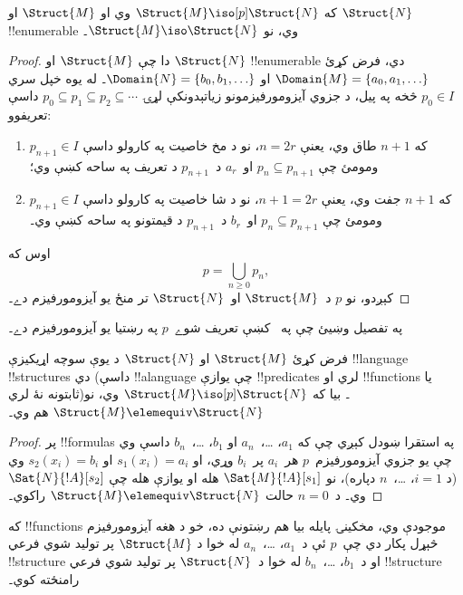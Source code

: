 \documentclass[../../../include/open-logic-section]{subfiles}
\begin{document}
\begin{thm}
  که $\Struct{M} \iso[p] \Struct{N}$ وي او $\Struct{M}$ او
  $\Struct{N}$ !!{enumerable} وي، نو $\Struct{M} \iso \Struct{N}$۔
\end{thm}

\begin{proof}
  دا چې $\Struct{M}$ او $\Struct{N}$ !!{enumerable} دي، فرض کړئ
  $\Domain{M} = \{a_0, a_1, \ldots \}$ او
  $\Domain{N} = \{b_0, b_1, \ldots \}$۔ له يوه خپل سري
  $p_0 \in I$ څخه په پيل، د جزوي آيزومورفيزمونو زياتېدونکې لړۍ
  $p_0 \subseteq p_1 \subseteq p_2 \subseteq \cdots$ داسې تعريفوو:
  \begin{enumerate}
  \item که $n+1$ طاق وي، يعنې $n = 2r$، نو د مخ خاصيت په کارولو
    داسې $p_{n+1} \in I$ ومومئ چې $p_n \subseteq p_{n+1}$ او~$a_r$
    د~$p_{n+1}$ د تعريف په ساحه کښې وي؛
  \item که $n+1$ جفت وي، يعنې $n+1 =2r$، نو د شا خاصيت په کارولو
    داسې $p_{n+1} \in I$ ومومئ چې $p_n \subseteq p_{n+1}$ او~$b_r$
    د~$p_{n+1}$ د قيمتونو په ساحه کښې وي۔
  \end{enumerate}
اوس که
\[
p = \bigcup_{n\ge 0} p_n,
\]
کېږدو، نو $p$ د~$\Struct{M}$ او~$\Struct{N}$ تر منځ يو آيزومورفيزم
دے۔
\end{proof}

\begin{prob}
  په تفصيل وښيئ چې په~ کښې تعريف
  شوے~$p$ په رښتيا يو آيزومورفيزم دے۔
\end{prob}

\begin{thm}
  فرض کړئ $\Struct{M}$ او $\Struct{N}$ د يوې سوچه اړيکيزې
  !!{language} !!{structure}s دي (داسې !!a{language} چې يوازې
  !!{predicate}s لري او !!{function}s يا ثابتونه نۀ لري)۔ بيا که
  $\Struct{M} \iso[p] \Struct{N}$ وي، نو $\Struct{M} \elemequiv
  \Struct{N}$ هم وي۔
\end{thm}

\begin{proof}
  پر !!{formula}s په استقرا ښودل کېږي چې که $a_1$، \dots،~$a_n$ او
  $b_1$، \dots،~$b_n$ داسې وي چې يو جزوي آيزومورفيزم~$p$ هر~$a_i$
  پر~$b_i$ وړي، او $s_1(x_i) =a_i$ او $s_2(x_i) =b_i$ وي (د
  $i =1$، \dots،~$n$ دپاره)، نو $\Sat{M}{!A}[s_1]$ هله او يوازې هله
  چې $\Sat{N}{!A}[s_2]$ وي۔ د~$n=0$ حالت
  $\Struct{M} \elemequiv \Struct{N}$ راکوي۔
\end{proof}

\begin{rem}
که !!{function}s موجودې وي، مخکينۍ پايله بيا هم رښتونې ده، خو د هغه
آيزومورفيزم څېړل پکار دي چې~$p$ ئې د~$a_1$، \dots،~$a_n$ له خوا د
$\Struct{M}$ پر توليد شوي فرعي !!{structure} او د~$b_1$،
\dots،~$b_n$ له خوا د~$\Struct{N}$ پر توليد شوي فرعي !!{structure}
رامنځته کوي۔
\end{rem}
\end{document}
